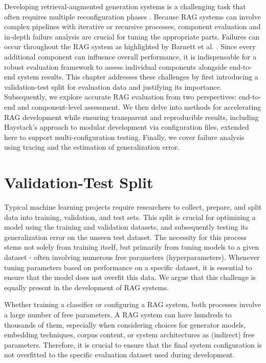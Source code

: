 Developing retrieval-augmented generation systems is a challenging task that often requires multiple reconfiguration phases \cite{Simon.10112024}. Because RAG systems can involve complex pipelines with iterative or recursive processes, component evaluation and in-depth failure analysis are crucial for tuning the appropriate parts. Failures can occur throughout the RAG system as highlighted by Barnett et al. \cite{Barnett.2024}. Since every additional component can influence overall performance, it is indispensable for a robust evaluation framework to assess individual components alongside end-to-end system results. This chapter addresses these challenges by first introducing a validation-test split for evaluation data and justifying its importance. Subsequently, we explore accurate RAG evaluation from two perspectives: end-to-end and component-level assessment. We then delve into methods for accelerating RAG development while ensuring transparent and reproducible results, including Haystack's approach to modular development via configuration files, extended here to support multi-configuration testing. Finally, we cover failure analysis using tracing and the estimation of generalization error.

\section{Validation-Test Split}
Typical machine learning projects require researchers to collect, prepare, and split data into training, validation, and test sets. This split is crucial for optimizing a model using the training and validation datasets, and subsequently testing its generalization error on the unseen test dataset. The necessity for this process stems not solely from training itself, but primarily from tuning models to a given dataset - often involving numerous free parameters (hyperparameters). Whenever tuning parameters based on performance on a specific dataset, it is essential to ensure that the model does not overfit this data. We argue that this challenge is equally present in the development of RAG systems.

Whether training a classifier or configuring a RAG system, both processes involve a large number of free parameters. A RAG system can have hundreds to thousands of them, especially when considering choices for generator models, embedding techniques, corpus content, or system architectures as (indirect) free parameters. Therefore, it is crucial to ensure that the final system configuration is not overfitted to the specific evaluation dataset used during development.

